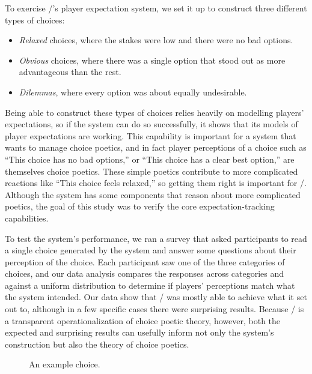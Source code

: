 To exercise \dunyazad/'s player expectation system, we set it up to construct three different types of choices:
%
\begin{itemize}
  \item \emph{Relaxed} choices, where the stakes were low and there were no bad options.
  \item \emph{Obvious} choices, where there was a single option that stood out as more advantageous than the rest.
  \item \emph{Dilemmas}, where every option was about equally undesirable.
\end{itemize}
%
Being able to construct these types of choices relies heavily on modelling players' expectations, so if the system can do so successfully, it shows that its models of player expectations are working.
%
This capability is important for a system that wants to manage choice poetics, and in fact player perceptions of a choice such as ``This choice has no bad options,'' or ``This choice has a clear best option,'' are themselves choice poetics.
%
These simple poetics contribute to more complicated reactions like ``This choice feels relaxed,'' so getting them right is important for \dunyazad/.
%
Although the system has some components that reason about more complicated poetics, the goal of this study was to verify the core expectation-tracking capabilities.


To test the system's performance, we ran a survey that asked participants to read a single choice generated by the system and answer some questions about their perception of the choice.
%
Each participant saw one of the three categories of choices, and our data analysis compares the responses across categories and against a uniform distribution to determine if players' perceptions match what the system intended.
%
Our data show that \dunyazad/ was mostly able to achieve what it set out to, although in a few specific cases there were surprising results.
%
Because \dunyazad/ is a transparent operationalization of choice poetic theory, however, both the expected and surprising results can usefully inform not only the system's construction but also the theory of choice poetics.

\begin{figure}[!h]
\centering
{}
  \caption{An example choice.}
  \label{fig:exchoice}
\end{figure}


